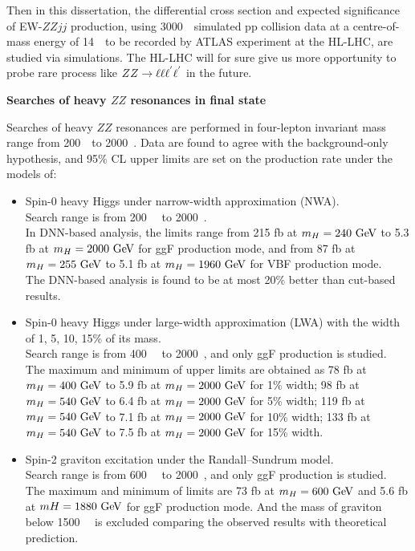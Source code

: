 Then in this dissertation, the differential cross section and expected significance of EW-$ZZjj$ production, 
using 3000~\ifb~simulated pp collision data at a centre-of-mass energy of 14~\tev~to be recorded by ATLAS experiment at the HL-LHC,
are studied via simulations.
The HL-LHC will for sure give us more opportunity to probe rare process like $ZZ \rightarrow \ell\ell\ell^{'}\ell^{'}$ in the future.

\textbf{Searches of heavy $ZZ$ resonances in \llll final state}

Searches of heavy $ZZ$ resonances are performed in four-lepton invariant mass \mfl range from 200~\gev~to 2000~\gev.
Data are found to agree with the background-only hypothesis, and 95\% CL upper limits are set on the production rate under the models of:
\begin{itemize}
	\item Spin-0 heavy Higgs under narrow-width approximation (NWA). \\
Search range is from 200~\gev~ to 2000~\gev.\\
In DNN-based analysis, the limits range from 215 fb at $m_{H} = 240~\text{Ge\kern -0.1em V}$ to 5.3 fb at $m_{H} = 2000~\text{Ge\kern -0.1em V}$ for ggF production mode,
and from 87 fb at $m_{H} = 255~\text{Ge\kern -0.1em V}$ to 5.1 fb at $m_{H} = 1960~\text{Ge\kern -0.1em V}$ for VBF production mode.\\
The DNN-based analysis is found to be at most 20\% better than cut-based results.
	\item Spin-0 heavy Higgs under large-width approximation (LWA) with the width of 1, 5, 10, 15\% of its mass.\\
Search range is from 400~\gev~ to 2000~\gev, and only ggF production is studied.\\
The maximum and minimum of upper limits are obtained as 78 fb at $m_{H} = 400~\text{Ge\kern -0.1em V}$ to 5.9 fb at $m_{H} = 2000~\text{Ge\kern -0.1em V}$ for 1\% width;
98 fb at $m_{H} = 540~\text{Ge\kern -0.1em V}$ to 6.4 fb at $m_{H} = 2000~\text{Ge\kern -0.1em V}$ for 5\% width;
119 fb at $m_{H} = 540~\text{Ge\kern -0.1em V}$ to 7.1 fb at $m_{H} = 2000~\text{Ge\kern -0.1em V}$ for 10\% width;
133 fb at $m_{H} = 540~\text{Ge\kern -0.1em V}$ to 7.5 fb at $m_{H} = 2000~\text{Ge\kern -0.1em V}$ for 15\% width.
	\item Spin-2 graviton excitation under the Randall–Sundrum model.\\
Search range is from 600~\gev~ to 2000~\gev, and only ggF production is studied.\\
The maximum and minimum of limits are 73 fb at $m_{H} = 600~\text{Ge\kern -0.1em V}$ and 5.6 fb at $mH = 1880~\text{Ge\kern -0.1em V}$ for ggF production mode.
And the mass of graviton below 1500~\gev~ is excluded comparing the observed results with theoretical prediction.
\end{itemize}
~~

